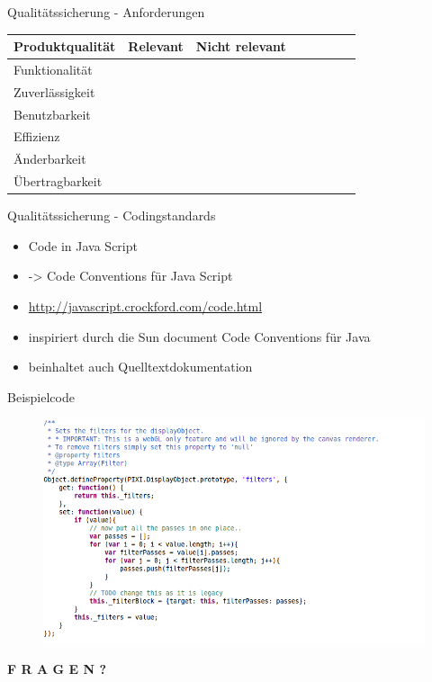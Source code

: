 \documentclass{beamer}
\newcommand{\cmark}{\ding{51}}%
\begin{document}
\begin{frame}{Qualitätssicherung - Anforderungen}
\begin{center}
    \begin{tabular}{ | l | c | c | c | c | c | c | c | }
    \hline
     Produktqualität & Relevant & Nicht relevant \\ \hline
	 Funktionalität   & \cmark & \\ \hline
	 Zuverlässigkeit  &  & \cmark  \\ \hline	
	 Benutzbarkeit & \cmark &  \\ \hline
	 Effizienz & & \cmark  \\ \hline
	 Änderbarkeit &  \cmark &  \\ \hline
	 Übertragbarkeit &  \cmark & \\ \hline
	 
    \end{tabular}
\end{center}

\end{frame}
\begin{frame}{Qualitätssicherung - Codingstandards}
\begin{itemize}
\item Code in Java Script
\item -> Code Conventions für Java Script
\item \url{http://javascript.crockford.com/code.html}
\item inspiriert durch die Sun document Code Conventions für Java
\item beinhaltet auch Quelltextdokumentation

\end{itemize}
\end{frame}

\begin{frame}{Beispielcode}
\begin{figure}[htb]
  \centering
  \includegraphics[scale=0.4]{7.png}
  \label{PNFs}
\end{figure} 

\end{frame}
\begin{frame}
\Huge \center \textbf{F R A G E N ?}
\end{frame}
\end{document}
